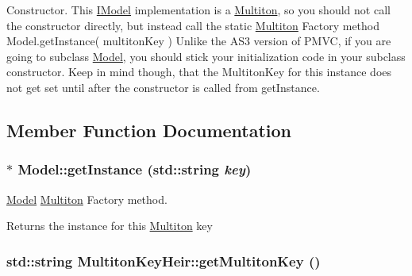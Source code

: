 Constructor. This {\ttfamily \hyperlink{class_pure_m_v_c_1_1_i_model}{IModel}} implementation is a \hyperlink{class_pure_m_v_c_1_1_multiton}{Multiton}, so you should not call the constructor directly, but instead call the static \hyperlink{class_pure_m_v_c_1_1_multiton}{Multiton} Factory method {\ttfamily Model.getInstance( multitonKey )} Unlike the AS3 version of PMVC, if you are going to subclass \hyperlink{class_pure_m_v_c_1_1_model}{Model}, you should stick your initialization code in your subclass constructor. Keep in mind though, that the MultitonKey for this instance does not get set until after the constructor is called from {\ttfamily getInstance}. 

\subsection{Member Function Documentation}
\hypertarget{class_pure_m_v_c_1_1_model_a3de2966f67f3328abff9a2fc6c96b3e1}{
\subsubsection[{getInstance}]{ $\ast$ Model::getInstance (std::string {\em key})}}
\label{class_pure_m_v_c_1_1_model_a3de2966f67f3328abff9a2fc6c96b3e1}


{\ttfamily \hyperlink{class_pure_m_v_c_1_1_model}{Model}} \hyperlink{class_pure_m_v_c_1_1_multiton}{Multiton} Factory method. \begin{DoxyReturn}{Returns}
the instance for this \hyperlink{class_pure_m_v_c_1_1_multiton}{Multiton} key 
\end{DoxyReturn}
\hypertarget{class_pure_m_v_c_1_1_multiton_key_heir_aa5622459d33380deb08dc3cab8b991c7}{
\subsubsection[{getMultitonKey}]{\setlength{\rightskip}{0pt plus 5cm}std::string MultitonKeyHeir::getMultitonKey ()}}
\label{class_pure_m_v_c_1_1_multiton_key_heir_aa5622459d33380deb08dc3cab8b991c7}


